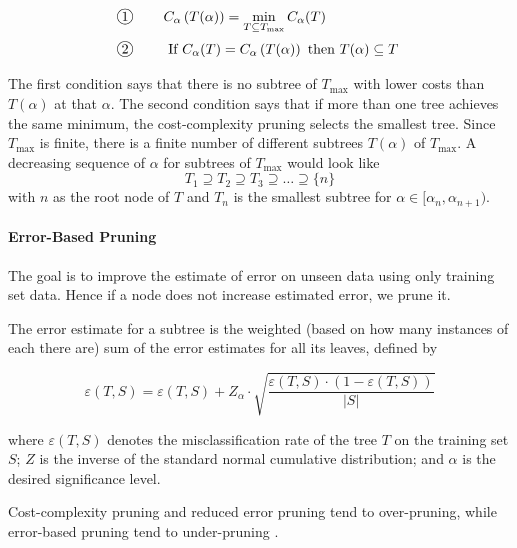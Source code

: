 \begin{align}
    \kreis{1} \qquad & C_{\alpha}\left(T(\alpha)\right) = \min_{T \subseteq T_{\max}} C_\alpha(T) \\
    \kreis{2} \qquad & \text{ If } C_\alpha(T) = C_{\alpha}\left(T(\alpha)\right) \text{ then } T(\alpha) \subseteq T
\end{align}

The first condition says that there is no subtree of $T_{\max}$ with lower costs than $T(\alpha)$ at that $\alpha$. The second condition says that if more than one tree achieves the same minimum, the cost-complexity pruning selects the smallest tree. Since $T_{\max}$ is finite, there is a finite number of different subtrees $T(\alpha)$ of $T_{\max}$. A decreasing sequence of $\alpha$ for subtrees of $T_{\max}$ would look like 
\[
    T_1 \supseteq T_2 \supseteq T_3 \supseteq \dots \supseteq \{n\}
\]
with $n$ as the root node of $T$ and $T_n$ is the smallest subtree for $\alpha \in [\alpha_n, \alpha_{n+1})$.

\paragraph{Error-Based Pruning}

The goal is to improve the estimate of error on unseen data using only training set data. Hence if a node does not increase estimated error, we prune it.

The error estimate for a subtree is the weighted (based on how many instances of each there are) sum of the error estimates for all its leaves, defined by

\begin{equation}
    \varepsilon (T, S) = \varepsilon(T, S) + Z_\alpha \cdot \sqrt{ \frac{\varepsilon(T,S) \cdot \left( 1- \varepsilon(T,S) \right)}{|S|} }
\end{equation}


where $\varepsilon(T, S)$ denotes the misclassification rate of the tree $T$ on the training set $S$; $Z$ is the inverse of the standard normal cumulative distribution; and $\alpha$ is the desired significance level.


\begin{remark}
    Cost-complexity pruning and reduced error pruning tend to over-pruning, while error-based pruning tend to under-pruning \cite[p.68]{rokach2008data}.
\end{remark}



\newpage


